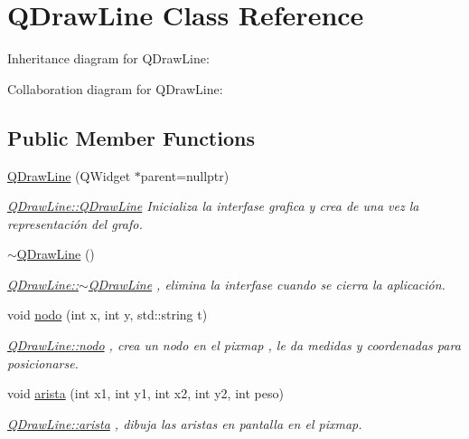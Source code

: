 \hypertarget{class_q_draw_line}{}\section{Q\+Draw\+Line Class Reference}
\label{class_q_draw_line}


Inheritance diagram for Q\+Draw\+Line\+:


Collaboration diagram for Q\+Draw\+Line\+:
\subsection*{Public Member Functions}
\begin{DoxyCompactItemize}
\item 
\hyperlink{class_q_draw_line_a07661a5f938e3c3f48f9bf888bb79f81}{Q\+Draw\+Line} (Q\+Widget $\ast$parent=nullptr)
\begin{DoxyCompactList}\small\item\em \hyperlink{class_q_draw_line_a07661a5f938e3c3f48f9bf888bb79f81}{Q\+Draw\+Line\+::\+Q\+Draw\+Line} Inicializa la interfase grafica y crea de una vez la representación del grafo. \end{DoxyCompactList}\item 
\mbox{\label{class_q_draw_line_aad8dd003553ea795ecf0815867560c12}} 
\hyperlink{class_q_draw_line_aad8dd003553ea795ecf0815867560c12}{$\sim$\+Q\+Draw\+Line} ()
\begin{DoxyCompactList}\small\item\em \hyperlink{class_q_draw_line_aad8dd003553ea795ecf0815867560c12}{Q\+Draw\+Line\+::$\sim$\+Q\+Draw\+Line} , elimina la interfase cuando se cierra la aplicación. \end{DoxyCompactList}\item 
void \hyperlink{class_q_draw_line_a0276a58cbd32372b0032f4c4c0118b0f}{nodo} (int x, int y, std\+::string t)
\begin{DoxyCompactList}\small\item\em \hyperlink{class_q_draw_line_a0276a58cbd32372b0032f4c4c0118b0f}{Q\+Draw\+Line\+::nodo} , crea un nodo en el pixmap , le da medidas y coordenadas para posicionarse. \end{DoxyCompactList}\item 
void \hyperlink{class_q_draw_line_ace0fde2db464370e94b5eb7f098e7b3b}{arista} (int x1, int y1, int x2, int y2, int peso)
\begin{DoxyCompactList}\small\item\em \hyperlink{class_q_draw_line_ace0fde2db464370e94b5eb7f098e7b3b}{Q\+Draw\+Line\+::arista} , dibuja las aristas en pantalla en el pixmap. \end{DoxyCompactList}\item 

\end{DoxyCompactItemize}

